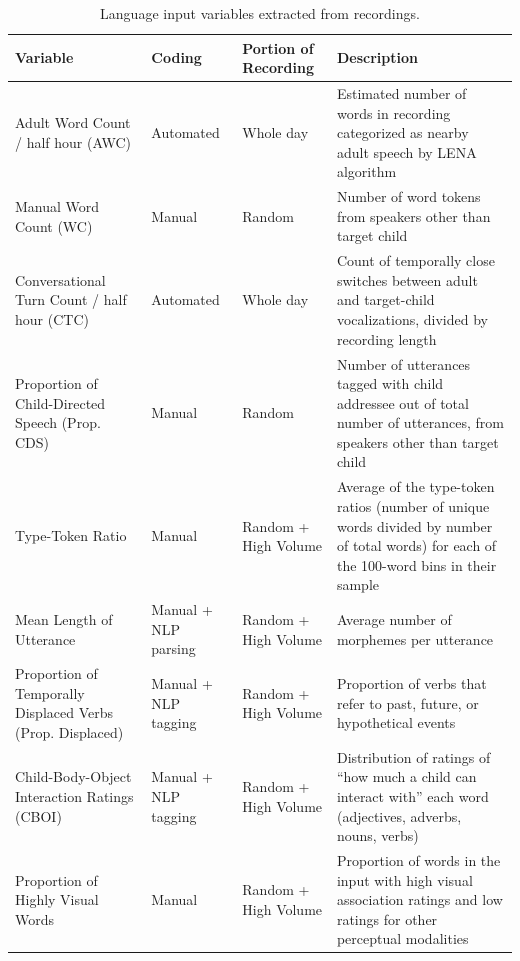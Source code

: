 \documentclass[
  man,floatsintext]{apa6}
\begin{document}
\begin{table}

\caption{\label{tab:variables-table}Language input variables extracted from recordings.}
\centering
\fontsize{9}{11}\selectfont
\begin{tabular}[t]{>{\raggedright\arraybackslash}p{1.4in}|>{\centering\arraybackslash}p{.8in}|>{\centering\arraybackslash}p{.75in}|>{\raggedright\arraybackslash}p{2.8in}}
\hline
Variable & Coding & Portion of Recording & Description\\
\hline
Adult Word Count / half hour (AWC) & Automated & Whole day & Estimated number of words in recording categorized as nearby adult speech by LENA algorithm\\
\hline
Manual Word Count (WC) & Manual & Random & Number of word tokens from speakers other than target child\\
\hline
Conversational Turn Count / half hour (CTC) & Automated & Whole day & Count of temporally close switches between adult and target-child vocalizations, divided by recording length\\
\hline
Proportion of Child-Directed Speech (Prop. CDS) & Manual & Random & Number of utterances tagged with child addressee out of total number of utterances, from speakers other than target child\\
\hline
Type-Token Ratio & Manual & Random + High Volume & Average of the type-token ratios (number of unique words divided by number of total words) for each of the 100-word bins in their sample\\
\hline
Mean Length of Utterance & Manual + NLP parsing & Random + High Volume & Average number of morphemes per utterance\\
\hline
Proportion of Temporally Displaced Verbs (Prop. Displaced) & Manual + NLP tagging & Random + High Volume & Proportion of verbs that refer to past, future, or hypothetical events\\
\hline
Child-Body-Object Interaction Ratings (CBOI) & Manual + NLP tagging & Random + High Volume & Distribution of ratings of “how much a child can interact with” each word (adjectives, adverbs, nouns, verbs)\\
\hline
Proportion of Highly Visual Words & Manual & Random + High Volume & Proportion of words in the input with high visual association ratings and low ratings for other perceptual modalities\\
\hline
\end{tabular}
\end{table}
\end{document}

